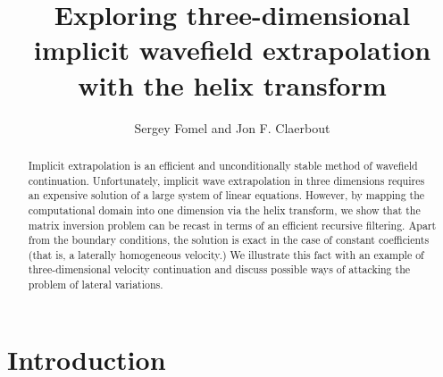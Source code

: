 


\title{Exploring three-dimensional implicit wavefield extrapolation
  with the helix transform}


\author{Sergey Fomel and Jon F. Claerbout}

\maketitle

\begin{abstract}
  Implicit extrapolation is an efficient and unconditionally stable
  method of wavefield continuation. Unfortunately, implicit wave
  extrapolation in three dimensions requires an expensive solution of
  a large system of linear equations. However, by mapping the
  computational domain into one dimension via the helix transform, we
  show that the matrix inversion problem can be recast in terms of an
  efficient recursive filtering. Apart from the boundary conditions,
  the solution is exact in the case of constant coefficients (that is,
  a laterally homogeneous velocity.) We illustrate this fact with an
  example of three-dimensional velocity continuation and discuss
  possible ways of attacking the problem of lateral variations.
\end{abstract}

\section{Introduction}

